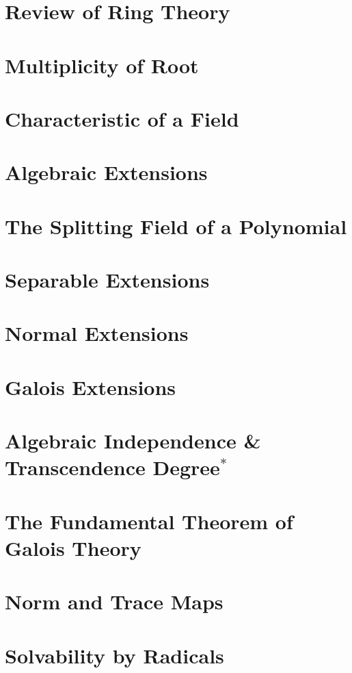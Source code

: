 \documentclass{article}
\begin{document}

\tableofcontents
\newpage

\section{Review of Ring Theory}

\section{Multiplicity of Root}

\section{Characteristic of a Field}

\section{Algebraic Extensions}

\section{The Splitting Field of a Polynomial}

\section{Separable Extensions}

\section{Normal Extensions}

\section{Galois Extensions}

\section{Algebraic Independence \& Transcendence Degree$^{\ast}$}

\section{The Fundamental Theorem of Galois Theory}

\section{Norm and Trace Maps}

\section{Solvability by Radicals}
\end{document}
